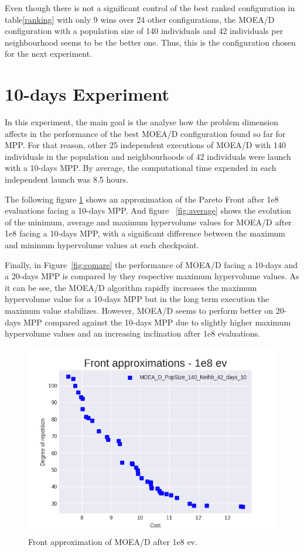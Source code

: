 Even though there is not a significant control of the best ranked configuration in table\ref{ranking} with only 9 wins over 24 other configurations, the MOEA/D configuration with a population size of 140 individuals and 42 individuals per neighbourhood seems to be the better one. Thus, this is the configuration chosen for the next experiment.


\section{10-days Experiment}
In this experiment, the main goal is the analyse how the problem dimension affects in the performance of the best MOEA/D configuration found so far for MPP. For that reason, other 25 independent executions of MOEA/D with 140 individuals in the population and neighbourhoods of 42 individuals were launch with a 10-days MPP. By average, the computational time expended in each independent launch was 8.5 hours.

The following figure \ref{fig:front} shows an approximation of the Pareto Front after 1e8 evaluations facing a 10-days MPP. And figure ~\ref{fig:average} shows the evolution of the minimum, average and maximum hypervolume values for MOEA/D after 1e8 facing a 10-days MPP, with a significant difference between the maximum and minimum hypervolume values at each checkpoint.

Finally, in Figure~\ref{fig:comare} the performance of MOEA/D facing a 10-days and a 20-days MPP is compared by they respective maximum hypervolume values. As it can be see, the MOEA/D algorithm rapidly increases the maximum hypervolume value for a 10-days MPP but in the long term execution the maximum value stabilizes. However, MOEA/D seems to perform better on 20-days MPP compared against the 10-days MPP due to slightly higher maximum hypervolume values and an increasing inclination after 1e8 evaluations.
\begin{figure}[H]
\centering
\includegraphics[scale=1.0]{../experiments/plots/fronts/MOEA_D_PopSize_140_Neihb_42_days_10_6.png}
\caption{Front approximation of MOEA/D after 1e8 ev.}
\label{fig:front}
\end{figure}

